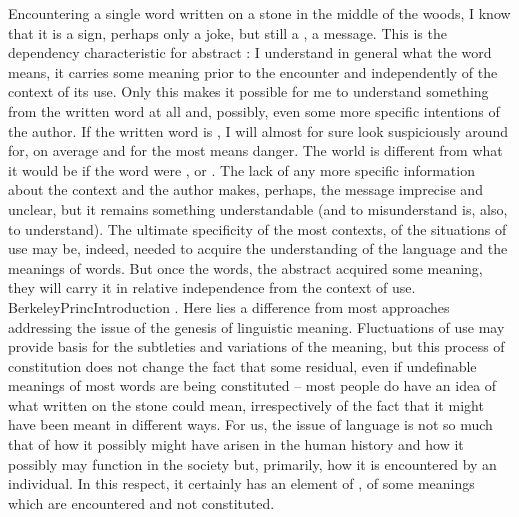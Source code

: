 Encountering a single word written on a stone in the middle of the woods, I know
that it is a sign, perhaps only a joke, but still a , a message. This
is the dependency characteristic for abstract : I
understand in general what the word means, it carries some meaning prior to the
 encounter and independently of the context of its use. 
Only this makes it possible for me to understand something from the
written word at all and, possibly,
even some more specific intentions of the author.  If the written word is , I will almost for sure look
suspiciously around for, on average and for the most  means danger. The world is different from what it would be if the word were
, or . The lack of any more specific information about
the context and the author makes, perhaps, the message imprecise and unclear,
but it remains something understandable (and to misunderstand is, also, to
understand).
The ultimate specificity of the most  contexts, of the 
situations of use may be, indeed, needed to acquire the understanding of the
language and the meanings of words. But once the words, the abstract 
acquired some meaning, they will carry it in relative independence from the
context of use. \citet{May we not, for example, be affected with the promise
  of a good thing, though we have not an idea of what it is? Or is not the being
  threatened with danger sufficient to excite a dread, though we think not of
  any particular evil likely to befall us, nor yet frame to ourselves an idea of
  danger in abstract?}{BerkeleyPrinc}{Introduction . Here lies a
  difference from most approaches addressing the issue of the genesis of
  linguistic meaning.  Fluctuations of use may provide basis for the subtleties
  and variations of the meaning, but this process of constitution does not
  change the fact that some residual, even if undefinable meanings of most words
  are being constituted -- most people do have an idea of what 
  written on the stone could mean, irrespectively of the fact that it might have
  been meant in different ways.  For us, the issue of language is not so much
  that of how it possibly might have arisen in the human history and how it
  possibly may function in the society but, primarily, how it is encountered by
  an individual. In this respect, it certainly has an element of
  , of some meanings which are encountered and not constituted.}

